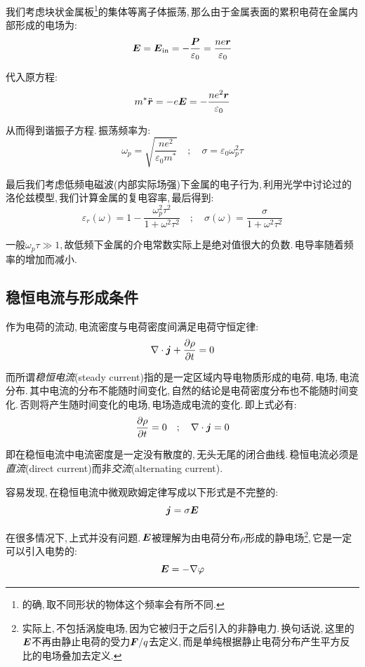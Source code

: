 我们考虑块状金属板\footnote{的确,\,取不同形状的物体这个频率会有所不同.}的集体等离子体振荡,\,那么由于金属表面的累积电荷在金属内部形成的电场为:
\[\boldsymbol{E}=\boldsymbol{E}_{\rm in}=-\frac{\boldsymbol{P}}{\varepsilon_0}=\frac{ne\boldsymbol{r}}{\varepsilon_0}\]

代入原方程:
\[m^\ast \ddot{\boldsymbol{r}}=-e\boldsymbol{E}=-\frac{ne^2\boldsymbol{r}}{\varepsilon_0}\]

从而得到谐振子方程.\,振荡频率为:
\[\omega_p=\sqrt{\frac{ne^2}{\varepsilon_0 m^\ast}} \quad;\quad\sigma=\varepsilon_0\omega_p^2\tau\]

最后我们考虑低频电磁波(内部实际场强)下金属的电子行为,\,利用光学中讨论过的洛伦兹模型,\,我们计算金属的复电容率,\,最后得到:
\[\varepsilon_r(\omega)=1-\frac{\omega_p^2\tau^2}{1+\omega^2\tau^2} \quad ; \quad \sigma(\omega)=\frac{\sigma}{1+\omega^2\tau^2}\]

一般$\omega_p\tau\gg 1$,\,故低频下金属的介电常数实际上是绝对值很大的负数.\,电导率随着频率的增加而减小.


\subsection{稳恒电流与形成条件}

作为电荷的流动,\,电流密度与电荷密度间满足电荷守恒定律:
\[\nabla\cdot\boldsymbol{j}+\frac{\partial\rho}{\partial t}=0\]

而所谓\emph{稳恒电流}(steady current)指的是一定区域内导电物质形成的电荷,\,电场,\,电流分布.\,其中电流的分布不能随时间变化,\,自然的结论是电荷密度分布也不能随时间变化.\,否则将产生随时间变化的电场,\,电场造成电流的变化.\,即上式必有:
\[\frac{\partial\rho}{\partial t}=0\quad;\quad \nabla\cdot\boldsymbol{j}=0\]

即在稳恒电流中电流密度是一定没有散度的,\,无头无尾的闭合曲线.\,稳恒电流必须是\emph{直流}(direct current)而非\emph{交流}(alternating current).

容易发现,\,在稳恒电流中微观欧姆定律写成以下形式是不完整的:
\[\boldsymbol{j}=\sigma \boldsymbol{E}\]

在很多情况下,\,上式并没有问题.\,$\boldsymbol{E}$被理解为由电荷分布$\rho$形成的静电场\footnote{实际上,\,不包括涡旋电场,\,因为它被归于之后引入的非静电力.\,换句话说,\,这里的$\boldsymbol{E}$不再由静止电荷的受力$\boldsymbol{F}/q$去定义,\,而是单纯根据静止电荷分布产生平方反比的电场叠加去定义.},\,它是一定可以引入电势的:
\[\boldsymbol{E}=-\nabla\varphi\]

